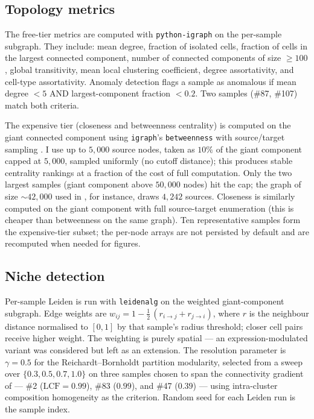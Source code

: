 \subsection*{Topology metrics}

The free-tier metrics are computed with \texttt{python-igraph} on the per-sample subgraph. They include: mean degree, fraction of isolated cells, fraction of cells in the largest connected component, number of connected components of size $\geq 100$, global transitivity, mean local clustering coefficient, degree assortativity, and cell-type assortativity. Anomaly detection flags a sample as anomalous if mean degree $< 5$ AND largest-component fraction $< 0.2$. Two samples (\#87, \#107) match both criteria.

The expensive tier (closeness and betweenness centrality) is computed on the giant connected component using \texttt{igraph}'s \texttt{betweenness} with source/target sampling \cite{brandes2007centrality}. I use up to $5{,}000$ source nodes, taken as $10\%$ of the giant component capped at $5{,}000$, sampled uniformly (no cutoff distance); this produces stable centrality rankings at a fraction of the cost of full computation. Only the two largest samples (giant component above $50{,}000$ nodes) hit the cap; the graph of size ${\sim}42{,}000$ used in , for instance, draws $4{,}242$ sources. Closeness is similarly computed on the giant component with full source-target enumeration (this is cheaper than betweenness on the same graph). Ten representative samples form the expensive-tier subset; the per-node arrays are not persisted by default and are recomputed when needed for figures.

\subsection*{Niche detection}

Per-sample Leiden \cite{traag2019leiden} is run with \texttt{leidenalg} on the weighted giant-component subgraph. Edge weights are $w_{ij} = 1 - \tfrac{1}{2}\,(r_{i\to j} + r_{j\to i})$, where $r$ is the neighbour distance normalised to $[0,1]$ by that sample's radius threshold; closer cell pairs receive higher weight. The weighting is purely spatial --- an expression-modulated variant was considered but left as an extension. The resolution parameter is $\gamma = 0.5$ for the Reichardt--Bornholdt partition modularity, selected from a sweep over $\{0.3, 0.5, 0.7, 1.0\}$ on three samples chosen to span the connectivity gradient of  --- \#2 ($\mathrm{LCF} = 0.99$), \#83 ($0.99$), and \#47 ($0.39$) --- using intra-cluster composition homogeneity as the criterion. Random seed for each Leiden run is the sample index.

